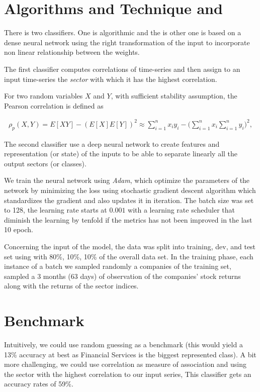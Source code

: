 \documentclass[a4paper,twoside]{article}
\begin{document}
\section{Algorithms and Technique and}
\label{sec:org68d454b}

There is two classifiers. One is algorithmic and the is other one is based on
a dense neural network using the right transformation of the input to
incorporate non linear relationship between the weights.

The first classifier computes correlations of time-series and then assign to an
input time-series the \emph{sector} with which it has the highest correlation. 

For two random variables \(X\) and \(Y\), with sufficient stability assumption, the
Pearson correlation is defined as

\begin{align*}
  \rho_p(X, Y) = E[XY] - (E[X]E[Y])^2 \approx \sum_{i=1}^n x_iy_i - \Big(\sum_{i=1}^nx_i\sum_{i=1}^n y_i\Big)^2,
\end{align*}


The second classifier use a deep neural network to create features and
representation (or state) of the inputs to be able to separate linearly all
the output sectors (or classes).

We train the neural network using \emph{Adam}, which optimize the parameters of the
network by minimizing the loss using stochastic gradient descent algorithm
which standardizes the gradient and also updates it in iteration. The batch
size was set to 128, the learning rate starts at \(0.001\) with a learning rate
scheduler that diminish the learning by tenfold if the metrics has not been
improved in the last 10 epoch.

Concerning the input of the model, the data was split into training, dev, and
test set using with 80\%, 10\%, 10\% of the overall data set. In the training
phase, each instance of a batch we sampled randomly a companies of the training
set, sampled a 3 months (63 days) of observation of the companies' stock
returns along with the returns of the sector indices.

\section{Benchmark}
\label{sec:org789fa4d}

Intuitively, we could use random guessing as a benchmark (this would yield a
13\% accuracy at best as Financial Services is the biggest represented class).
A bit more challenging, we could use correlation as measure of association and
using the sector with the highest correlation to our input series, This
classifier gets an accuracy rates of 59\%.
\end{document}
